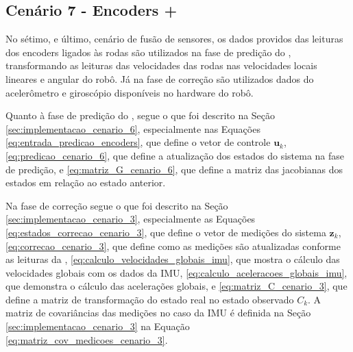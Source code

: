 \documentclass[acronym, symbols, table]{fei}
\begin{document}
		\subsection{Cenário 7 - Encoders + } \label{sec:implementacao_cenario_7}
		
			No sétimo, e último, cenário de fusão de sensores, os dados providos das leituras dos encoders ligados às rodas são utilizados na fase de predição do , transformando as leituras das velocidades das rodas nas velocidades locais lineares e angular do robô. Já na fase de correção são utilizados dados do acelerômetro e giroscópio disponíveis no hardware do robô.
			
			Quanto à fase de predição do , segue o que foi descrito na Seção \ref{sec:implementacao_cenario_6}, especialmente nas Equações \eqref{eq:entrada_predicao_encoders}, que define o vetor de controle $\textbf{u}_k$, \eqref{eq:predicao_cenario_6}, que define a atualização dos estados do sistema na fase de predição, e \eqref{eq:matriz_G_cenario_6}, que define a matriz das jacobianas dos estados em relação ao estado anterior.
			
			Na fase de correção segue o que foi descrito na Seção \ref{sec:implementacao_cenario_3}, especialmente as Equações \eqref{eq:estados_correcao_cenario_3}, que define o vetor de medições do sistema $\textbf{z}_k$, \eqref{eq:correcao_cenario_3}, que define como as medições são atualizadas conforme as leituras da , \eqref{eq:calculo_velocidades_globais_imu}, que mostra o cálculo das velocidades globais com os dados da IMU, \eqref{eq:calculo_aceleracoes_globais_imu}, que demonstra o cálculo das acelerações globais, e \eqref{eq:matriz_C_cenario_3}, que define a matriz de transformação do estado real no estado observado $C_{k}$. A matriz de covariâncias das medições no caso da IMU é definida na Seção \ref{sec:implementacao_cenario_3} na Equação \eqref{eq:matriz_cov_medicoes_cenario_3}.
		
\end{document}
